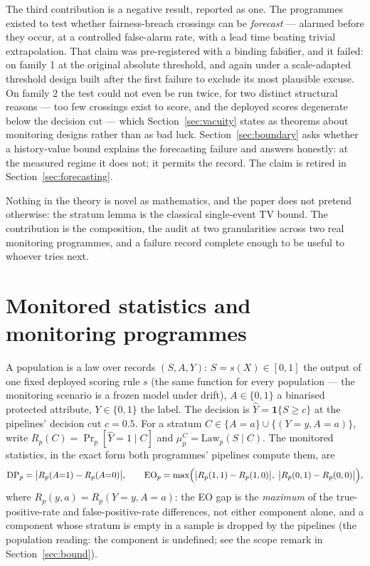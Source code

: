 \documentclass[11pt]{article}
\begin{document}
The third contribution is a negative result, reported as one. The
programmes existed to test whether fairness-breach crossings can be
\emph{forecast} --- alarmed before they occur, at a controlled
false-alarm rate, with a lead time beating trivial extrapolation.
That claim was pre-registered with a binding falsifier, and it
failed: on family 1 at the original absolute threshold, and again
under a scale-adapted threshold design built after the first
failure to exclude its most plausible excuse. On family 2 the test
could not even be run twice, for two distinct structural reasons
--- too few crossings exist to score, and the deployed scores
degenerate below the decision cut --- which
Section~\ref{sec:vacuity} states as theorems about monitoring
designs rather than as bad luck. Section~\ref{sec:boundary} asks
whether a history-value bound explains the forecasting failure and
answers honestly: at the measured regime it does not; it permits
the record. The claim is retired in Section~\ref{sec:forecasting}.

Nothing in the theory is novel as mathematics, and the paper does
not pretend otherwise: the stratum lemma is the classical
single-event TV bound. The contribution is the composition, the
audit at two granularities across two real monitoring programmes,
and a failure record complete enough to be useful to whoever tries
next.

\section{Monitored statistics and monitoring programmes}
\label{sec:objects}

A population is a law over records $(S, A, Y)$: $S = s(X) \in [0,1]$
the output of one fixed deployed scoring rule $s$ (the same
function for every population --- the monitoring scenario is a
frozen model under drift), $A \in \{0,1\}$ a binarised protected
attribute, $Y \in \{0,1\}$ the label. The decision is
$\hat Y = \mathbf 1\{S \ge c\}$ at the pipelines' decision cut
$c = 0.5$. For a stratum $C \in \{A{=}a\} \cup \{(Y{=}y, A{=}a)\}$,
write $R_p(C) = \Pr_p[\hat Y = 1 \mid C]$ and
$\mu_p^C = \mathrm{Law}_p(S \mid C)$. The monitored statistics, in
the exact form both programmes' pipelines compute them, are
\[
\mathrm{DP}_p = \bigl| R_p(A{=}1) - R_p(A{=}0) \bigr|,
\qquad
\mathrm{EO}_p = \max\Bigl(
\bigl| R_p(1,1) - R_p(1,0) \bigr|,\;
\bigl| R_p(0,1) - R_p(0,0) \bigr| \Bigr),
\]
where $R_p(y,a) = R_p(Y{=}y, A{=}a)$: the EO gap is the
\emph{maximum} of the true-positive-rate and false-positive-rate
differences, not either component alone, and a component whose
stratum is empty in a sample is dropped by the pipelines (the
population reading: the component is undefined; see the scope
remark in Section~\ref{sec:bound}).
\end{document}
